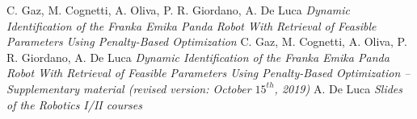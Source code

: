 \documentclass{article}
\begin{document}
\begin{thebibliography}{}
C. Gaz, M. Cognetti, A. Oliva, P. R. Giordano, A. De Luca
\emph {Dynamic Identification of the Franka Emika Panda Robot With Retrieval of Feasible Parameters Using Penalty-Based Optimization}
C. Gaz, M. Cognetti, A. Oliva, P. R. Giordano, A. De Luca
\emph {Dynamic Identification of the Franka Emika Panda Robot With Retrieval of Feasible Parameters Using Penalty-Based Optimization – Supplementary material (revised version: October $15^{th}$, 2019)}
A. De Luca
\emph {Slides of the Robotics I/II courses}
\end{thebibliography}
\end{document}
